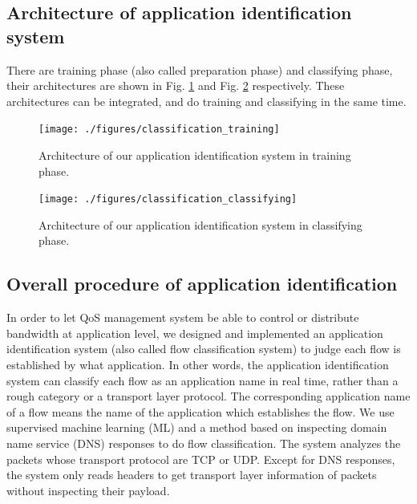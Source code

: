 \documentclass[journal]{IEEEtran}
\begin{document}
\subsection{Architecture of application identification system}
There are training phase (also called preparation phase) and classifying phase, their architectures are shown in Fig. \ref{fig:class_training} and Fig. \ref{fig:class_classifying} respectively. These architectures can be integrated, and do training and classifying in the same time.

\begin{figure}[!t]
\centering
\texttt{[image: ./figures/classification\_training]}
\caption{Architecture of our application identification system in training phase.}
\label{fig:class_training}
\end{figure}

\begin{figure}[!t]
\centering
\texttt{[image: ./figures/classification\_classifying]}
\caption{Architecture of our application identification system in classifying phase.}
\label{fig:class_classifying}
\end{figure}



\subsection{Overall procedure of application identification}
In order to let QoS management system be able to control or distribute bandwidth at application level, we designed and implemented an application identification system (also called flow classification system) to judge each flow is established by what application. In other words, the application identification system can classify each flow as an application name in real time, rather than a rough category or a transport layer protocol. The corresponding application name of a flow means the name of the application which establishes the flow. We use supervised machine learning (ML) and a method based on inspecting domain name service (DNS) responses to do flow classification. The system analyzes the packets whose transport protocol are TCP or UDP. Except for DNS responses, the system only reads headers to get transport layer information of packets without inspecting their payload.
\end{document}

